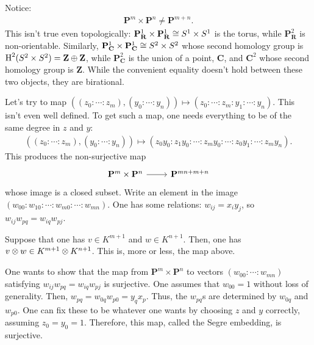 \documentclass [11 pt, oneside] {article}
\begin{document}
Notice:
\begin{align*}
	\mathbf{P}^m \times \mathbf{P}^n\ne \mathbf{P}^{m+n}.
\end{align*}
This isn't true even topologically: $\mathbf{P}^1_{\mathbf{R}}\times \mathbf{P}^1_{\mathbf{R}}\cong S^1\times S^1$ is the torus, while $\mathbf{P}^2_{\mathbf{R}}$ is non-orientable. Similarly, $\mathbf{P}^1_{\mathbf{C}}\times \mathbf{P}^1_{\mathbf{C}}\cong S^2\times S^2$ whose second homology group is $\operatorname{H}^2(S^2\times S^2) =  \mathbf{Z}\oplus \mathbf{Z}$, while $\mathbf{P}^2_{\mathbf{C}}$ is the union of a point, $\mathbf{C}$, and $\mathbf{C}^2$ whose second homology group is $\mathbf{Z}$. While the convenient equality doesn't hold between these two objects, they are birational.

Let's try to map $((z_0:\cdots:z_m), (y_0:\cdots:y_n))\longmapsto (z_0:\cdots:z_m:y_1:\cdots:y_n)$. This isn't even well defined. To get such a map, one needs everything to be of the same degree in $z$ and $y$:
\begin{align*}
	((z_0:\cdots:z_m), (y_0:\cdots:y_n))\longmapsto (z_0y_0:z_1y_0:\cdots:z_my_0:\cdots: z_0y_1:\cdots:z_my_n).
\end{align*}
This produces the non-surjective map 
\[
\begin{tikzcd}
\mathbf{P}^m\times \mathbf{P}^n\ar[r]& \mathbf{P}^{mn+m+n}
\end{tikzcd}
\]
whose image is a closed subset. Write an element in the image $(w_{00}:w_{10}:\cdots: w_{m0} : \cdots: w_{mn})$. One has some relations: $w_{ij} = x_iy_j$, so $w_{ij}w_{pq}=w_{iq}w_{pj}$. 

Suppose that one has $v\in K^{m+1}$ and $w\in K^{n+1}$. Then, one has $v\otimes w \in K^{m+1}\otimes K^{n+1}$. This is, more or less, the map above.

One wants to show that the map from $\mathbf{P}^m\times \mathbf{P}^n$ to vectors $(w_{00}:\cdots:w_{mn})$ satisfying $w_{ij}w_{pq}=w_{iq}w_{pj}$ is surjective. One assumes that $w_{00}=1$ without loss of generality. Then, $w_{pq} = w_{0q}w_{p0}=y_qx_p$. Thus, the $w_{pq}$s are determined by $ w_{0q}$ and $w_{p0}$. One can fix these to be whatever one wants by choosing $z$ and $y$ correctly, assuming $z_0=y_0=1$. Therefore, this map, called the Segre embedding, is surjective.
\end{document}
